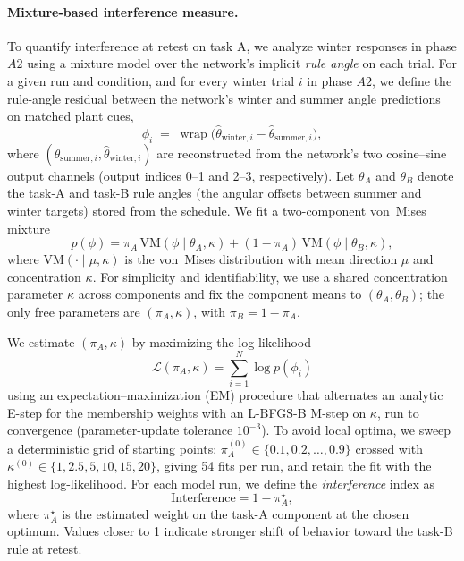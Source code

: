 \documentclass{article}
\theoremstyle{plain}
\theoremstyle{definition}
\theoremstyle{remark}
\begin{document}
\paragraph{Mixture-based interference measure.}
To quantify interference at retest on task A, we analyze winter responses in phase $A2$ using a mixture model over the network's implicit \emph{rule angle} on each trial. For a given run and condition, and for every winter trial $i$ in phase $A2$, we define the rule-angle residual between the network's winter and summer angle predictions on matched plant cues,
\[
\phi_i \;=\; \operatorname{wrap}\!\big( \hat{\theta}_{\text{winter},i} - \hat{\theta}_{\text{summer},i} \big),
\]
where $(\hat{\theta}_{\text{summer},i}, \hat{\theta}_{\text{winter},i})$ are reconstructed from the network's two cosine--sine output channels (output indices 0--1 and 2--3, respectively). Let $\theta_A$ and $\theta_B$ denote the task-A and task-B rule angles (the angular offsets between summer and winter targets) stored from the schedule. We fit a two-component von~Mises mixture
\[
p(\phi) = \pi_A \, \mathrm{VM}(\phi \mid \theta_A, \kappa) + (1 - \pi_A) \, \mathrm{VM}(\phi \mid \theta_B, \kappa),
\]
where $\mathrm{VM}(\cdot \mid \mu, \kappa)$ is the von~Mises distribution with mean direction $\mu$ and concentration $\kappa$. For simplicity and identifiability, we use a shared concentration parameter $\kappa$ across components and fix the component means to $(\theta_A, \theta_B)$; the only free parameters are $(\pi_A, \kappa)$, with $\pi_B = 1 - \pi_A$.

We estimate $(\pi_A, \kappa)$ by maximizing the log-likelihood
\[
\mathcal{L}(\pi_A, \kappa) = \sum_{i=1}^N \log p(\phi_i)
\]
using an expectation--maximization (EM) procedure that alternates an analytic E-step for the membership weights with an L-BFGS-B M-step on $\kappa$, run to convergence (parameter-update tolerance $10^{-3}$). To avoid local optima, we sweep a deterministic grid of starting points: $\pi_A^{(0)} \in \{0.1, 0.2, \ldots, 0.9\}$ crossed with $\kappa^{(0)} \in \{1, 2.5, 5, 10, 15, 20\}$, giving 54 fits per run, and retain the fit with the highest log-likelihood. For each model run, we define the \emph{interference} index as
\[
\mathrm{Interference} = 1 - \pi_A^\star,
\]
where $\pi_A^\star$ is the estimated weight on the task-A component at the chosen optimum. Values closer to 1 indicate stronger shift of behavior toward the task-B rule at retest.
\end{document}
